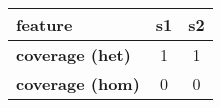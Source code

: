 \documentclass{standalone}
\begin{document}
\begin{tabular}{|l|c|c|}
\toprule
\textbf{feature} & s1 & s2 \\
\midrule
\textbf{coverage (het)} & 1 & 1 \\
\textbf{coverage (hom)} & 0 & 0 \\
\bottomrule
\end{tabular}
\end{document}
